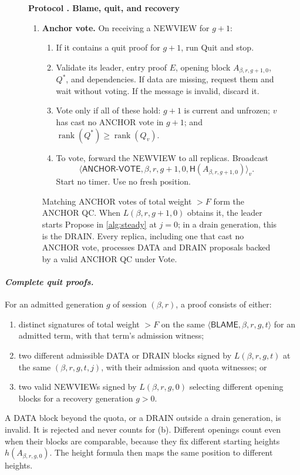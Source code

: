 \documentclass[11pt,a4paper]{article}
\newcommand{\RR}[1]{{\color{rrRed}#1}}
\newcommand{\Hash}{\mathsf H}
\newcommand{\rank}{\operatorname{rank}}
\newcommand{\tagg}[1]{\ensuremath{\mathsf{#1}}}
\newcommand{\defterm}[1]{\textcolor{rrBlue}{\textit{#1}}}
\newcounter{protocol}
\newenvironment{protocol}[3][htbp]{\begin{figure}[#1]\refstepcounter{protocol}\label{#2}
\begin{mdframed}[linewidth=.6pt,skipabove=0pt,skipbelow=0pt,
innertopmargin=7pt,innerbottommargin=7pt]\small
\textbf{Protocol \theprotocol. #3}\par\smallskip}{\end{mdframed}\end{figure}}
\begin{document}
\begin{protocol}{alg:recovery}{Blame, quit, and recovery}
\begin{enumerate}[label=\textbf{\arabic*)},itemsep=3pt]
\item \textbf{Anchor vote.} On receiving a NEWVIEW for $g+1$:
 \begin{enumerate}[label=(\alph*)]
 \item If it contains a quit proof for $g+1$, run Quit and stop.
 \item Validate its leader, entry proof $E$, opening block $A_{\beta,r,g+1,0}$,
       $Q^*$, and dependencies. If data are missing, request them and
       wait without voting. If the message is invalid, discard it.
 \item Vote only if all of these hold: $g+1$ is current and unfrozen; $v$
       has cast no ANCHOR vote in $g+1$; and $\rank(Q^*)\ge\rank(Q_v)$.
 \item To vote, forward the NEWVIEW to all replicas. Broadcast
       \[\langle\tagg{ANCHOR\mbox{-}VOTE},\beta,r,g+1,0,\Hash(A_{\beta,r,g+1,0})\rangle_v.\]
       Start no timer. Use no fresh position.
 \end{enumerate}
 Matching ANCHOR votes \RR{of total weight $>F$} form the ANCHOR QC.
 When $L(\beta,r,g+1,0)$ obtains it, the leader starts Propose in
 \cref{alg:steady} at $j=0$\RR{; in a drain generation, this is the
 DRAIN}. Every replica, including one that cast no ANCHOR vote,
 processes DATA \RR{and DRAIN} proposals backed by a valid ANCHOR QC
 under Vote.
\end{enumerate}
\end{protocol}

\paragraph{\defterm{Complete quit proofs.}}
For an admitted generation $g$ \RR{of session $(\beta,r)$}, a proof consists of
either:
\begin{enumerate}[label=(\alph*)]
\item distinct signatures \RR{of total weight $>F$} on the same
$\langle\tagg{BLAME},\beta,r,g,t\rangle$ for an admitted term, with that term's
admission witness;
\item two different admissible DATA \RR{or DRAIN} blocks signed by
$L(\beta,r,g,t)$ at the same $(\beta,r,g,t,j)$, with their admission \RR{and quota}
witnesses; or
\item two valid NEWVIEWs signed by $L(\beta,r,g,0)$ selecting different opening
blocks for a recovery generation $g>0$.
\end{enumerate}
\RR{A DATA block beyond the quota, or a DRAIN outside a drain generation,
is invalid. It is rejected and never counts for (b).}
Different openings count even when their blocks are comparable, because
they fix different starting heights $h(A_{\beta,r,g,0})$. The height formula then
maps the same position to different heights.
\end{document}
